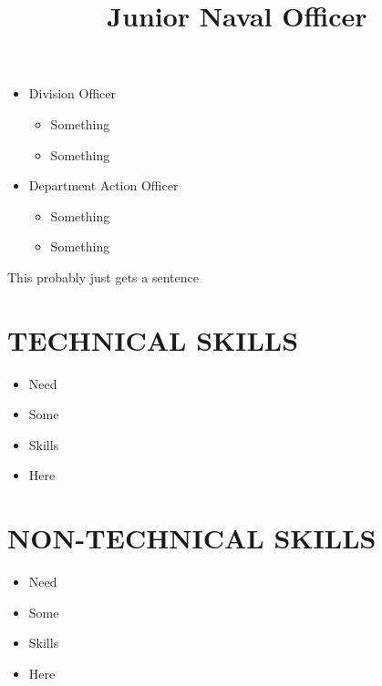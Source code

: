 \documentclass[line, margin]{resume}
\begin{document}
\begin{resume}
\begin{position}
\begin{itemize}
\begin{itemize}
      \end{itemize}
    \item Division Officer
      \begin{itemize}
        \item Something
        \item Something
      \end{itemize}
    \item Department Action Officer
      \begin{itemize}
        \item Something
        \item Something
      \end{itemize}
    \end{itemize}
  \end{position}
  
  \title{Junior Naval Officer}

  \begin{position}
    This probably just gets a sentence
  \end{position}

  
  \section{TECHNICAL SKILLS}
  \begin{itemize}
  \item Need
  \item Some
  \item Skills
  \item Here
  \end{itemize}
  
  \section{NON-TECHNICAL SKILLS}
  \begin{itemize}
  \item Need
  \item Some
  \item Skills
  \item Here
  \end{itemize}
  

\end{resume}
\end{document}
